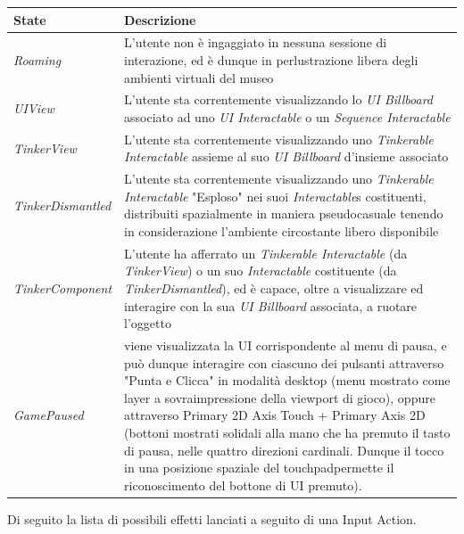 \documentclass[10pt, openany]{article}
\begin{document}
    \begin{table}[h]
      \centering
      \begin{tabular}{@{} p{} p{} @{}}
        \toprule
        \textbf{State} & \textbf{Descrizione} \\
        \midrule
        \textit{Roaming} & L'utente non \`e ingaggiato in nessuna sessione di interazione, ed \`e dunque in perlustrazione libera degli ambienti virtuali del 
          museo \\
        \textit{UIView} & L'utente sta correntemente visualizzando lo \textit{UI Billboard} associato ad uno \textit{UI Interactable} o un \textit{Sequence Interactable} \\
        \textit{TinkerView} & L'utente sta correntemente visualizzando uno \textit{Tinkerable Interactable} assieme al suo \textit{UI Billboard} d'insieme associato \\
        \textit{TinkerDismantled} & L'utente sta correntemente visualizzando uno \textit{Tinkerable Interactable} "Esploso" nei suoi \textit{Interactable}s costituenti, 
          distribuiti spazialmente in maniera pseudocasuale tenendo in considerazione l'ambiente circostante libero disponibile \\
        \textit{TinkerComponent} & L'utente ha afferrato un \textit{Tinkerable Interactable} (da \textit{TinkerView}) o un suo \textit{Interactable} costituente 
          (da \textit{TinkerDismantled}), ed \`e capace, oltre a visualizzare ed interagire con la sua \textit{UI Billboard} associata, a ruotare l'oggetto \\
        \textit{GamePaused} & viene visualizzata la UI corrispondente al menu di pausa, e pu\`o dunque interagire con ciascuno dei pulsanti attraverso "Punta e Clicca"
          in modalit\`a desktop (menu mostrato come layer a sovraimpressione della viewport di gioco), oppure attraverso Primary 2D Axis Touch + Primary Axis 2D (bottoni mostrati 
          solidali alla mano che ha premuto il tasto di pausa, nelle quattro direzioni cardinali. Dunque il tocco in una posizione spaziale del 
          touchpad\footnotemark permette il riconoscimento del bottone di UI premuto). \\
        \bottomrule
      \end{tabular}
    \end{table}
    Di seguito la lista di possibili effetti lanciati a seguito di una Input Action.\par 
\end{document}
